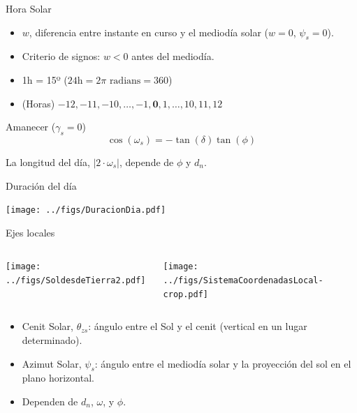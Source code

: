 \documentclass[xcolor={usenames,svgnames,dvipsnames}]{beamer}
\begin{document}
\begin{frame}[label={sec:orgfe21d9b}]{Hora Solar}
\begin{itemize}
\item \(w\), diferencia entre instante en curso y el mediodía solar (\(w = 0\), \(\psi_s = 0\)).
\item Criterio de signos: \(w < 0\) antes del mediodía.
\item 1h = 15º (\(24\text{h} = 2\pi \text{ radians} = 360\))
\item (Horas) \(-12, -11, -10, \dots, -1, \textbf{0}, 1, \dots, 10, 11, 12\)
\end{itemize}

\begin{block}{Amanecer (\(\gamma_{s}=0\))}
\[
\cos(\omega_{s}) = -\tan(\delta)\tan(\phi)
\]

La longitud del día, \(|2 \cdot \omega_s|\), depende de \(\phi\) y \(d_n\).
\end{block}
\end{frame}

\begin{frame}[label={sec:orgfe58768}]{Duración del día}
\begin{center}
\texttt{[image: ../figs/DuracionDia.pdf]}
\end{center}
\end{frame}

\begin{frame}[label={sec:org865731e},plain]{Ejes locales}
\begin{columns}
\begin{column}{0.5\columnwidth}
\begin{center}
\texttt{[image: ../figs/SoldesdeTierra2.pdf]}
\end{center}
\end{column}

\begin{column}{0.5\columnwidth}
\begin{center}
\texttt{[image: ../figs/SistemaCoordenadasLocal-crop.pdf]}
\end{center}
\end{column}
\end{columns}

\begin{itemize}
\item \alert{Cenit Solar}, \(\theta_{zs}\): ángulo entre el Sol y el cenit (vertical en un lugar determinado).
\item \alert{Azimut Solar}, \(\psi_s\): ángulo entre el mediodía solar y la proyección del sol en el plano horizontal.
\item Dependen de \(d_n\), \(\omega\), y \(\phi\).
\end{itemize}
\end{frame}
\end{document}
